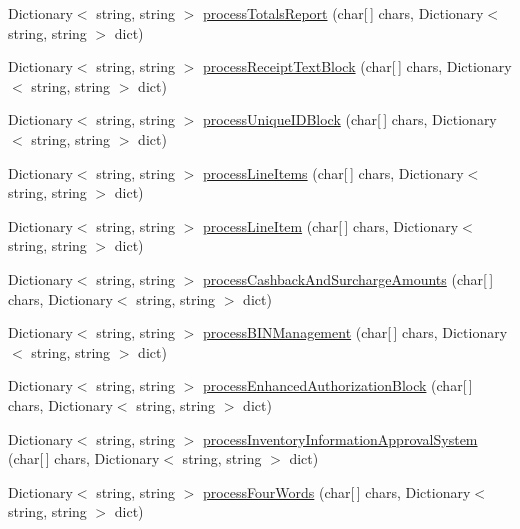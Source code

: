 \begin{DoxyCompactItemize}
\item 
Dictionary$<$ string, string $>$ \mbox{\hyperlink{class_form_sim_1_1_t_c_p_handler_a9375cfb16933acd6cb6fd986f1c3f6c7}{process\+Totals\+Report}} (char\mbox{[}$\,$\mbox{]} chars, Dictionary$<$ string, string $>$ dict)
\item 
Dictionary$<$ string, string $>$ \mbox{\hyperlink{class_form_sim_1_1_t_c_p_handler_ac00f88ba9b49858e4d87b9e67e29aa87}{process\+Receipt\+Text\+Block}} (char\mbox{[}$\,$\mbox{]} chars, Dictionary$<$ string, string $>$ dict)
\item 
Dictionary$<$ string, string $>$ \mbox{\hyperlink{class_form_sim_1_1_t_c_p_handler_ac1914cfaa1d821983139e6af9a0ab79c}{process\+Unique\+I\+D\+Block}} (char\mbox{[}$\,$\mbox{]} chars, Dictionary$<$ string, string $>$ dict)
\item 
Dictionary$<$ string, string $>$ \mbox{\hyperlink{class_form_sim_1_1_t_c_p_handler_af20e4c201d008d4551c454e2e3203622}{process\+Line\+Items}} (char\mbox{[}$\,$\mbox{]} chars, Dictionary$<$ string, string $>$ dict)
\item 
Dictionary$<$ string, string $>$ \mbox{\hyperlink{class_form_sim_1_1_t_c_p_handler_a36fbcafba09f1511127e2ceaa0dac92b}{process\+Line\+Item}} (char\mbox{[}$\,$\mbox{]} chars, Dictionary$<$ string, string $>$ dict)
\item 
Dictionary$<$ string, string $>$ \mbox{\hyperlink{class_form_sim_1_1_t_c_p_handler_a5e5d6e5d1e9995cd5f212bac4eb9168a}{process\+Cashback\+And\+Surcharge\+Amounts}} (char\mbox{[}$\,$\mbox{]} chars, Dictionary$<$ string, string $>$ dict)
\item 
Dictionary$<$ string, string $>$ \mbox{\hyperlink{class_form_sim_1_1_t_c_p_handler_a1c458e61e4781a61d1cfa43e9347b3c6}{process\+B\+I\+N\+Management}} (char\mbox{[}$\,$\mbox{]} chars, Dictionary$<$ string, string $>$ dict)
\item 
Dictionary$<$ string, string $>$ \mbox{\hyperlink{class_form_sim_1_1_t_c_p_handler_aab0d3c1c8fc713dee9f077cfd3e2689c}{process\+Enhanced\+Authorization\+Block}} (char\mbox{[}$\,$\mbox{]} chars, Dictionary$<$ string, string $>$ dict)
\item 
Dictionary$<$ string, string $>$ \mbox{\hyperlink{class_form_sim_1_1_t_c_p_handler_accf737ffcc4e0d879f98978d85b005ae}{process\+Inventory\+Information\+Approval\+System}} (char\mbox{[}$\,$\mbox{]} chars, Dictionary$<$ string, string $>$ dict)
\item 
Dictionary$<$ string, string $>$ \mbox{\hyperlink{class_form_sim_1_1_t_c_p_handler_a0f25a73a16e6cea8f4fb65eb41ef8373}{process\+Four\+Words}} (char\mbox{[}$\,$\mbox{]} chars, Dictionary$<$ string, string $>$ dict)

\end{DoxyCompactItemize}
